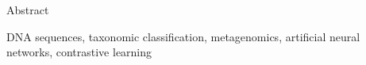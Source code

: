 \cleardoublepage{}

\secondabstract{}

Abstract

\secondkeywords{}
DNA sequences, taxonomic classification,  metagenomics, artificial neural networks, contrastive learning
